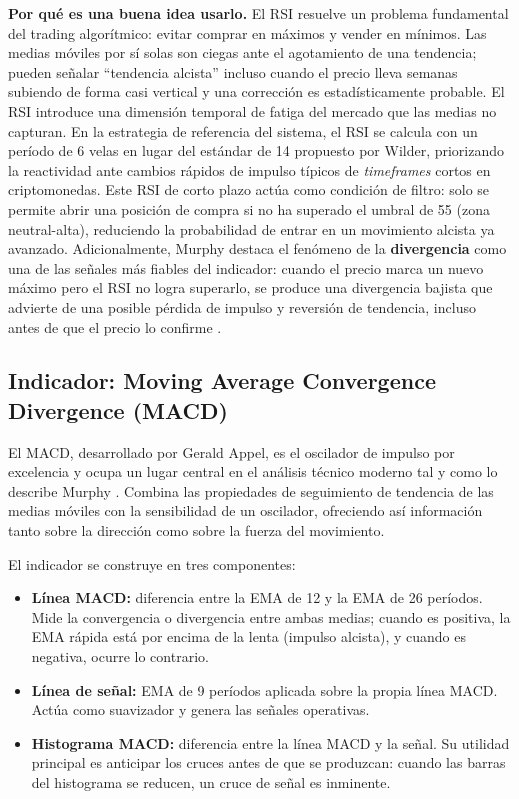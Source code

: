 \textbf{Por qué es una buena idea usarlo.} El RSI resuelve un problema fundamental del trading algorítmico: evitar comprar en máximos y vender en mínimos. Las medias móviles por sí solas son ciegas ante el agotamiento de una tendencia; pueden señalar ``tendencia alcista'' incluso cuando el precio lleva semanas subiendo de forma casi vertical y una corrección es estadísticamente probable. El RSI introduce una dimensión temporal de fatiga del mercado que las medias no capturan. En la estrategia de referencia del sistema, el RSI se calcula con un período de 6 velas en lugar del estándar de 14 propuesto por Wilder, priorizando la reactividad ante cambios rápidos de impulso típicos de \textit{timeframes} cortos en criptomonedas. Este RSI de corto plazo actúa como condición de filtro: solo se permite abrir una posición de compra si no ha superado el umbral de 55 (zona neutral-alta), reduciendo la probabilidad de entrar en un movimiento alcista ya avanzado. Adicionalmente, Murphy destaca el fenómeno de la \textbf{divergencia} como una de las señales más fiables del indicador: cuando el precio marca un nuevo máximo pero el RSI no logra superarlo, se produce una divergencia bajista que advierte de una posible pérdida de impulso y reversión de tendencia, incluso antes de que el precio lo confirme \parencite{murphy_technical_1999}.

\subsection{Indicador: Moving Average Convergence Divergence (MACD)}

El MACD, desarrollado por Gerald Appel, es el oscilador de impulso por excelencia y ocupa un lugar central en el análisis técnico moderno tal y como lo describe Murphy \parencite{murphy_technical_1999}. Combina las propiedades de seguimiento de tendencia de las medias móviles con la sensibilidad de un oscilador, ofreciendo así información tanto sobre la dirección como sobre la fuerza del movimiento.

El indicador se construye en tres componentes:

\begin{itemize}
    \item \textbf{Línea MACD:} diferencia entre la EMA de 12 y la EMA de 26 períodos. Mide la convergencia o divergencia entre ambas medias; cuando es positiva, la EMA rápida está por encima de la lenta (impulso alcista), y cuando es negativa, ocurre lo contrario.
    \item \textbf{Línea de señal:} EMA de 9 períodos aplicada sobre la propia línea MACD. Actúa como suavizador y genera las señales operativas.
    \item \textbf{Histograma MACD:} diferencia entre la línea MACD y la señal. Su utilidad principal es anticipar los cruces antes de que se produzcan: cuando las barras del histograma se reducen, un cruce de señal es inminente.
\end{itemize}

